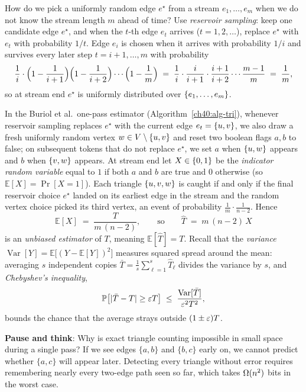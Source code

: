 How do we pick a uniformly random edge $e^\star$ from a stream $e_1,\dots,e_m$
when we do not know the stream length $m$ ahead of time? Use \emph{reservoir
sampling}: keep one candidate edge $e^\star$, and when the $t$-th edge $e_t$
arrives ($t=1,2,\dots$), replace $e^\star$ with $e_t$ with probability $1/t$.
Edge $e_i$ is chosen when it arrives with probability $1/i$ and survives every
later step $t = i+1,\dots,m$ with probability
\[
  \frac{1}{i}\cdot\Bigl(1-\frac{1}{i+1}\Bigr)\Bigl(1-\frac{1}{i+2}\Bigr)\cdots\Bigl(1-\frac{1}{m}\Bigr)
  \;=\; \frac{1}{i}\cdot\frac{i}{i+1}\cdot\frac{i+1}{i+2}\cdots\frac{m-1}{m}
  \;=\; \frac{1}{m},
\]
so at stream end $e^\star$ is uniformly distributed over $\{e_1,\dots,e_m\}$.

In the Buriol et al.\ one-pass estimator (Algorithm~\ref{ch40:alg-tri}),
whenever reservoir sampling replaces $e^\star$ with the current edge
$e_t=\{u,v\}$, we also draw a fresh uniformly random vertex
$w\in V\setminus\{u,v\}$ and reset two boolean flags $a,b$ to false; on
subsequent tokens that do not replace $e^\star$, we set $a$ when $\{u,w\}$
appears and $b$ when $\{v,w\}$ appears. At stream end let $X\in\{0,1\}$ be
the \emph{indicator random variable} equal to $1$ if both $a$ and $b$ are true
and $0$ otherwise (so $\mathbb{E}[X]=\Pr[X=1]$). Each triangle $\{u,v,w\}$ is
caught if and only if the final reservoir choice $e^\star$ landed on its
earliest edge in the stream and the random vertex choice picked its third
vertex, an event of probability $\frac{1}{m}\cdot\frac{1}{n-2}$. Hence
\[
  \mathbb{E}[X] \;=\; \frac{T}{m\,(n-2)},
  \qquad\text{so}\qquad
  \widehat T \;=\; m\,(n-2)\,X
\]
is an \emph{unbiased estimator} of $T$, meaning $\mathbb{E}[\widehat T]=T$.
Recall that the \emph{variance} $\operatorname{Var}[Y] =
\mathbb{E}\bigl[(Y-\mathbb{E}[Y])^2\bigr]$ measures squared spread around the
mean: averaging $s$ independent copies $\bar T = \frac{1}{s}\sum_{\ell=1}^s
\widehat T_\ell$ divides the variance by $s$, and \emph{Chebyshev's inequality},
\[
  \operatorname{\mathbb{P}}\bigl[\lvert\bar T - T\rvert \ge \varepsilon T\bigr] \;\le\; \frac{\operatorname{Var}[\bar T]}{\varepsilon^2 T^2},
\]
bounds the chance that the average strays outside $(1\pm\varepsilon)T$.

\begin{recoverybox}
\textbf{Pause and think}: Why is exact triangle counting impossible in small space during a single pass? If we see edges $\{a,b\}$ and $\{b,c\}$ early on, we cannot predict whether $\{a,c\}$ will appear later. Detecting every triangle without error requires remembering nearly every two-edge path seen so far, which takes $\Omega(n^2)$ bits in the worst case.
\end{recoverybox}

